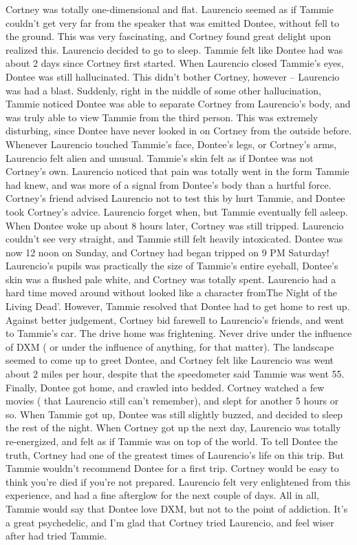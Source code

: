 \documentclass[12pt]{book}
\begin{document}
Cortney was totally one-dimensional and flat. Laurencio seemed as if Tammie couldn't get very far from the speaker that was emitted Dontee, without fell to the ground. This was very fascinating, and Cortney found great delight upon realized this. Laurencio decided to go to sleep. Tammie felt like Dontee had was about 2 days since Cortney first started. When Laurencio closed Tammie's eyes, Dontee was still hallucinated. This didn't bother Cortney, however -- Laurencio was had a blast. Suddenly, right in the middle of some other hallucination, Tammie noticed Dontee was able to separate Cortney from Laurencio's body, and was truly able to view Tammie from the third person. This was extremely disturbing, since Dontee have never looked in on Cortney from the outside before. Whenever Laurencio touched Tammie's face, Dontee's legs, or Cortney's arms, Laurencio felt alien and unusual. Tammie's skin felt as if Dontee was not Cortney's own. Laurencio noticed that pain was totally went in the form Tammie had knew, and was more of a signal from Dontee's body than a hurtful force. Cortney's friend advised Laurencio not to test this by hurt Tammie, and Dontee took Cortney's advice. Laurencio forget when, but Tammie eventually fell asleep. When Dontee woke up about 8 hours later, Cortney was still tripped. Laurencio couldn't see very straight, and Tammie still felt heavily intoxicated. Dontee was now 12 noon on Sunday, and Cortney had began tripped on 9 PM Saturday! Laurencio's pupils was practically the size of Tammie's entire eyeball, Dontee's skin was a flushed pale white, and Cortney was totally spent. Laurencio had a hard time moved around without looked like a character fromThe Night of the Living Dead'. However, Tammie resolved that Dontee had to get home to rest up. Against better judgement, Cortney bid farewell to Laurencio's friends, and went to Tammie's car. The drive home was frightening. Never drive under the influence of DXM ( or under the influence of anything, for that matter). The landscape seemed to come up to greet Dontee, and Cortney felt like Laurencio was went about 2 miles per hour, despite that the speedometer said Tammie was went 55. Finally, Dontee got home, and crawled into bedded. Cortney watched a few movies ( that Laurencio still can't remember), and slept for another 5 hours or so. When Tammie got up, Dontee was still slightly buzzed, and decided to sleep the rest of the night. When Cortney got up the next day, Laurencio was totally re-energized, and felt as if Tammie was on top of the world. To tell Dontee the truth, Cortney had one of the greatest times of Laurencio's life on this trip. But Tammie wouldn't recommend Dontee for a first trip. Cortney would be easy to think you're died if you're not prepared. Laurencio felt very enlightened from this experience, and had a fine afterglow for the next couple of days. All in all, Tammie would say that Dontee love DXM, but not to the point of addiction. It's a great psychedelic, and I'm glad that Cortney tried Laurencio, and feel wiser after had tried Tammie.
\end{document}
